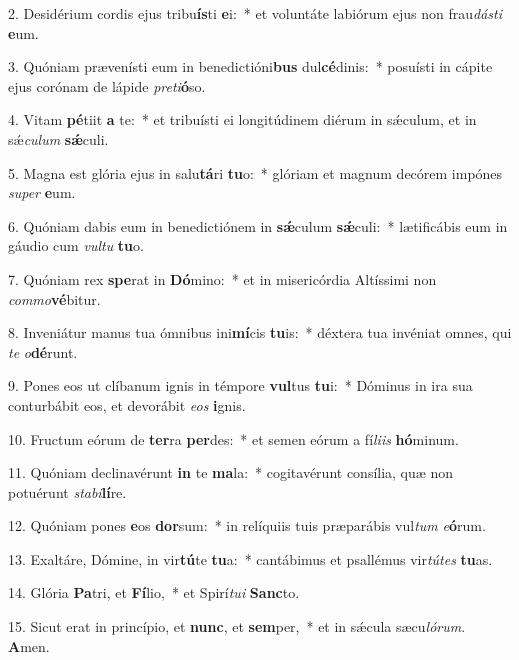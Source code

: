 2. Desidérium cordis ejus tribu\textbf{ís}ti \textbf{e}i:~*  et voluntáte labiórum ejus non frau\textit{dás}\textit{ti} \textbf{e}um.\

3. Quóniam prævenísti eum in benedictióni\textbf{bus} dul\textbf{cé}dinis:~*  posuísti in cápite ejus corónam de lápide \textit{pre}\textit{ti}\textbf{ó}so.\

4. Vitam \textbf{pé}tiit \textbf{a} te:~*  et tribuísti ei longitúdinem diérum in sǽculum, et in sǽ\textit{cu}\textit{lum} \textbf{sǽ}culi.\

5. Magna est glória ejus in salu\textbf{tá}ri \textbf{tu}o:~*  glóriam et magnum decórem impónes \textit{su}\textit{per} \textbf{e}um.\

6. Quóniam dabis eum in benedictiónem in \textbf{sǽ}culum \textbf{sǽ}culi:~*  lætificábis eum in gáudio cum \textit{vul}\textit{tu} \textbf{tu}o.\

7. Quóniam rex \textbf{spe}rat in \textbf{Dó}mino:~*  et in misericórdia Altíssimi non \textit{com}\textit{mo}\textbf{vé}bitur.\

8. Inveniátur manus tua ómnibus ini\textbf{mí}cis \textbf{tu}is:~*  déxtera tua invéniat omnes, qui \textit{te} \textit{o}\textbf{dé}runt.\

9. Pones eos ut clíbanum ignis in témpore \textbf{vul}tus \textbf{tu}i:~*  Dóminus in ira sua conturbábit eos, et devorábit \textit{e}\textit{os} \textbf{i}gnis.\

10. Fructum eórum de \textbf{ter}ra \textbf{per}des:~*  et semen eórum a fí\textit{li}\textit{is} \textbf{hó}minum.\

11. Quóniam declinavérunt \textbf{in} te \textbf{ma}la:~*  cogitavérunt consília, quæ non potuérunt \textit{sta}\textit{bi}\textbf{lí}re.\

12. Quóniam pones \textbf{e}os \textbf{dor}sum:~*  in relíquiis tuis præparábis vul\textit{tum} \textit{e}\textbf{ó}rum.\

13. Exaltáre, Dómine, in vir\textbf{tú}te \textbf{tu}a:~*  cantábimus et psallémus vir\textit{tú}\textit{tes} \textbf{tu}as.\

14. Glória \textbf{Pa}tri, et \textbf{Fí}lio,~*  et Spirí\textit{tu}\textit{i} \textbf{Sanc}to.\

15. Sicut erat in princípio, et \textbf{nunc}, et \textbf{sem}per,~*  et in sǽcula sæcu\textit{ló}\textit{rum}. \textbf{A}men.\

